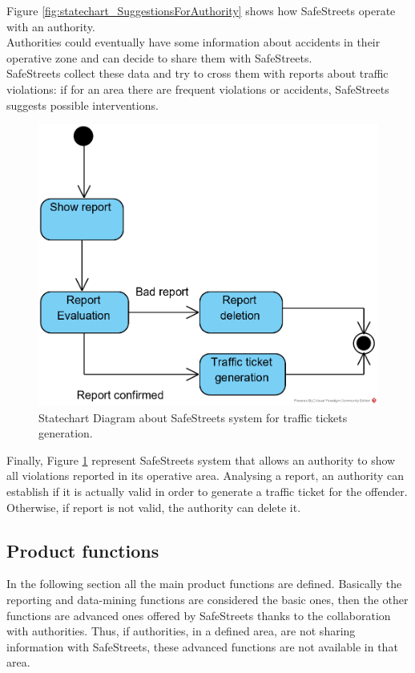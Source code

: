 \documentclass{article}
\begin{document}
			Figure \ref{fig:statechart_SuggestionsForAuthority} shows how SafeStreets operate with an authority.\\
			Authorities could eventually have some information about accidents in their operative zone and can decide to share them with SafeStreets.\\
			SafeStreets collect these data and try to cross them with reports about traffic violations: if for an area there are frequent violations or accidents, SafeStreets suggests possible interventions.
			
			\begin{figure}[H]
				\centering
				\includegraphics {diagrams/statechart_trafficTicket.png}
				\caption[Statechart Diagram3]{Statechart Diagram about SafeStreets system for traffic tickets generation.}
				\label{fig:statechart_trafficTickets}
			\end{figure}
			
			Finally, Figure \ref{fig:statechart_trafficTickets} represent SafeStreets system that allows an authority to show all violations reported in its operative area. Analysing a report, an authority can establish if it is actually valid in order to generate a traffic ticket for the offender. Otherwise, if report is not valid, the authority can delete it.
			
			\clearpage	   
	
		\subsection{Product functions}
			In the following section all the main product functions are defined. Basically the reporting and data-mining functions are considered the basic ones, then the other functions are advanced ones offered by SafeStreets thanks to the collaboration with authorities. Thus, if authorities, in a defined area, are not sharing information with SafeStreets, these advanced functions are not available in that area.
\end{document}
